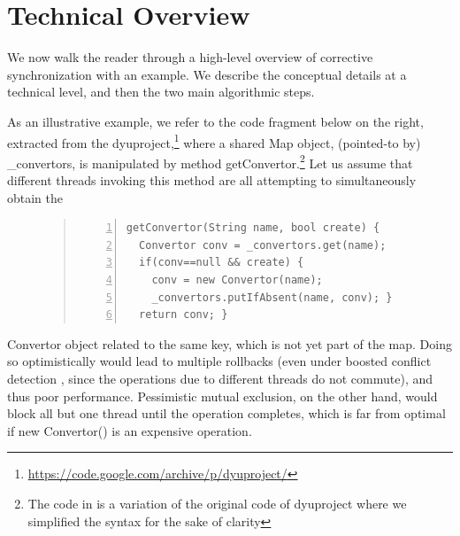 \section{Technical Overview}

We now walk the reader through a high-level overview of corrective synchronization with an example. We  describe the conceptual details at a technical level, and then the two main algorithmic steps.

%
As an illustrative example, we refer to the code fragment
below on the
right,
extracted from the {\sf dyuproject},\footnote{\url{https://code.google.com/archive/p/dyuproject/}} where a shared {\sf Map} object, (pointed-to by) {\sf \_convertors}, is manipulated by method {\sf getConvertor}.\footnote{The code in is a variation of the original code of {\sf dyuproject} where we simplified the syntax for the sake of clarity}
%
%
Let us assume that different threads invoking this method
are all attempting to simultaneously obtain the
\begin{figure}
  \begin{quote}
	\begin{lstlisting}[numbers=left]
getConvertor(String name, bool create) {
  Convertor conv = _convertors.get(name);
  if(conv==null && create) {
    conv = new Convertor(name);
    _convertors.putIfAbsent(name, conv); }
  return conv; }
	\end{lstlisting}
        \end{quote}
\end{figure}
%
{\sf Convertor} object related to the same key, which is not yet part of the map. Doing so optimistically would lead to multiple rollbacks (even under boosted conflict detection \cite{ppopp08}, since the operations due to different threads do not commute), and thus poor performance. Pessimistic mutual exclusion, on the other hand, would block all but one thread until the operation completes, which is far from optimal if {\sf new Convertor()} is an expensive operation.


